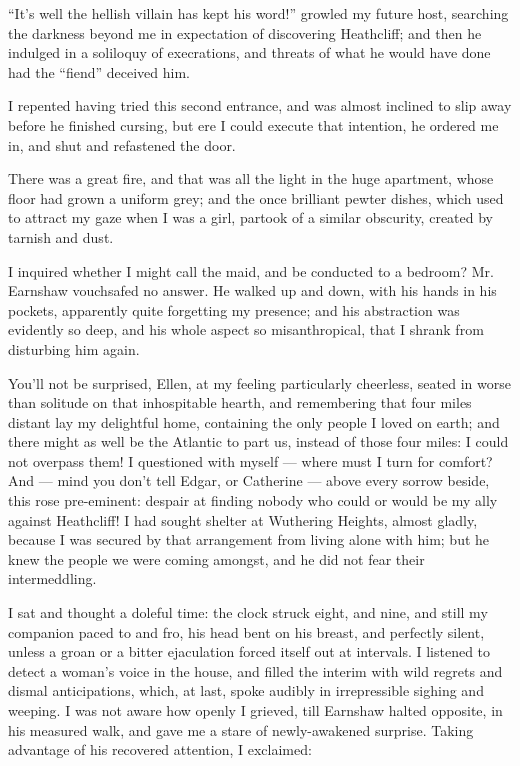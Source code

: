 \par “It's well the hellish villain has kept his word!” growled my future host, searching the darkness beyond me in expectation of discovering Heathcliff; and then he indulged in a soliloquy of execrations, and threats of what he would have done had the “fiend” deceived him.
\par I repented having tried this second entrance, and was almost inclined to slip away before he finished cursing, but ere I could execute that intention, he ordered me in, and shut and refastened the door.
\par There was a great fire, and that was all the light in the huge apartment, whose floor had grown a uniform grey; and the once brilliant pewter dishes, which used to attract my gaze when I was a girl, partook of a similar obscurity, created by tarnish and dust.
\par I inquired whether I might call the maid, and be conducted to a bedroom? Mr. Earnshaw vouchsafed no answer. He walked up and down, with his hands in his pockets, apparently quite forgetting my presence; and his abstraction was evidently so deep, and his whole aspect so misanthropical, that I shrank from disturbing him again.
\par You'll not be surprised, Ellen, at my feeling particularly cheerless, seated in worse than solitude on that inhospitable hearth, and remembering that four miles distant lay my delightful home, containing the only people I loved on earth; and there might as well be the Atlantic to part us, instead of those four miles: I could not overpass them! I questioned with myself — where must I turn for comfort? And — mind you don't tell Edgar, or Catherine — above every sorrow beside, this rose pre-eminent: despair at finding nobody who could or would be my ally against Heathcliff! I had sought shelter at Wuthering Heights, almost gladly, because I was secured by that arrangement from living alone with him; but he knew the people we were coming amongst, and he did not fear their intermeddling.
\par I sat and thought a doleful time: the clock struck eight, and nine, and still my companion paced to and fro, his head bent on his breast, and perfectly silent, unless a groan or a bitter ejaculation forced itself out at intervals. I listened to detect a woman's voice in the house, and filled the interim with wild regrets and dismal anticipations, which, at last, spoke audibly in irrepressible sighing and weeping. I was not aware how openly I grieved, till Earnshaw halted opposite, in his measured walk, and gave me a stare of newly-awakened surprise. Taking advantage of his recovered attention, I exclaimed:
